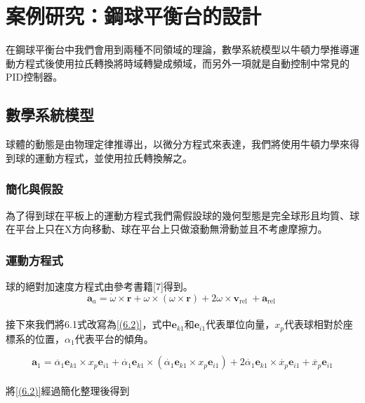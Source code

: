 \chapter{案例研究：鋼球平衡台的設計}
在鋼球平衡台中我們會用到兩種不同領域的理論，數學系統模型以牛頓力學推導運動方程式後使用拉氏轉換將時域轉變成頻域，而另外一項就是自動控制中常見的PID控制器。\\

\section{數學系統模型}
球體的動態是由物理定律推導出，以微分方程式來表達，我們將使用牛頓力學來得到球的運動方程式，並使用拉氏轉換解之。\\

\subsection{簡化與假設}
為了得到球在平板上的運動方程式我們需假設球的幾何型態是完全球形且均質、球在平台上只在X方向移動、球在平台上只做滾動無滑動並且不考慮摩擦力。\\

\subsection{運動方程式}
球的絕對加速度方程式由參考書籍[7]得到。\\

\begin{equation}
\mathbf{a}_a=\dot{\omega} \times \mathbf{r}+\omega \times(\omega \times \mathbf{r})+2 \omega \times \mathbf{v}_{\text {rel }}+\mathbf{a}_{\text {rel }}
\label{((6.1))}
\end{equation} \\

接下來我們將6.1式改寫為\ref{(6.2)}，式中\(\mathbf{e}_{k1}\)和\(\mathbf{e}_{i1}\)代表單位向量，\(x_p\)代表球相對於座標系的位置，\(\alpha_1\)代表平台的傾角。

\begin{equation}
\mathbf{a}_1=\ddot{\alpha_1} \mathbf{e}_{k1} \times x_p \mathbf{e}_{i1}+\dot{\alpha_1} \mathbf{e}_{k1} \times\left(\dot{\alpha_1} \mathbf{e}_{k1} \times x_p \mathbf{e}_{i1}\right)+2 \dot{\alpha_1} \mathbf{e}_{k1} \times \dot{x_p} \mathbf{e}_{i1}+\ddot{x_p} \mathbf{e}_{i1}
\label{(6.2)}
\end{equation} \\

將\ref{(6.2)}經過簡化整理後得到\\

